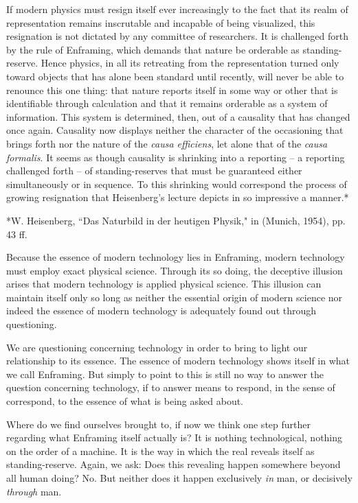 If modern physics must resign itself ever increasingly to the fact that its realm of representation remains inscrutable and incapable of being visualized, this resignation is not dictated by any committee of researchers. It is challenged forth by the rule of Enframing, which demands that nature be orderable as standing-reserve. Hence physics, in all its retreating from the representation turned only toward objects that has alone been standard until recently, will never be able to renounce this one thing: that nature reports itself in some way or other that is identifiable through calculation and that it remains orderable as a system of information. This system is determined, then, out of a causality that has changed once again. Causality now displays neither the character of the occasioning that brings forth nor the nature of the \textit{causa efficiens}, let alone that of the \textit{causa formalis}. It seems as though causality is shrinking into a reporting -- a reporting challenged forth -- of standing-reserves that must be guaranteed either simultaneously or in sequence. To this shrinking would correspond the process of growing resignation that Heisenberg's lecture depicts in so impressive a manner.*

*W. Heisenberg, ``Das Naturbild in der heutigen Physik," in  (Munich, 1954), pp. 43 ff.

Because the essence of modern technology lies in Enframing, modern technology must employ exact physical science. Through its so doing, the deceptive illusion arises that modern technology is applied physical science. This illusion can maintain itself only so long as neither the essential origin of modern science nor indeed the essence of modern technology is adequately found out through questioning.

We are questioning concerning technology in order to bring to light our relationship to its essence. The essence of modern technology shows itself in what we call Enframing. But simply to point to this is still no way to answer the question concerning technology, if to answer means to respond, in the sense of correspond, to the essence of what is being asked about.

Where do we find ourselves brought to, if now we think one step further regarding what Enframing itself actually is? It is nothing technological, nothing on the order of a machine. It is the way in which the real reveals itself as standing-reserve. Again, we ask: Does this revealing happen somewhere beyond all human doing? No. But neither does it happen exclusively \textit{in} man, or decisively \textit{through} man.

